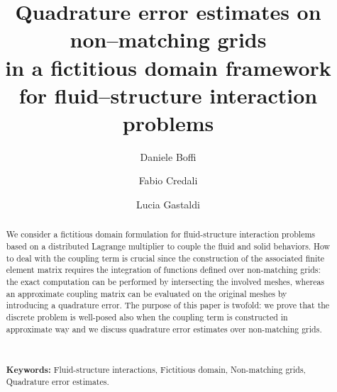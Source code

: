\documentclass[oneside]{amsart} %
\begin{document}
	
	\title[]{Quadrature error estimates on non--matching grids\\in a fictitious domain framework\\for fluid--structure interaction problems}%
	
	\author[Daniele Boffi]{Daniele Boffi}
	\address{Computer, electrical and mathematical sciences and engineering division, King Abdullah University of Science and Technology, Thuwal 23955, Saudi Arabia and Dipartimento di Matematica \textquoteleft F. Casorati\textquoteright, Universit\`a degli Studi di Pavia, via Ferrata 5, 27100, Pavia, Italy}
	
	\author{Fabio Credali}
	\address{Computer, electrical and mathematical sciences and engineering division, King Abdullah University of Science and Technology, Thuwal 23955, Saudi Arabia. Former affiliation: Istituto di Matematica Applicata e Tecnologie Informatiche \textquoteleft E. Magenes\textquoteright, Consiglio Nazionale delle Ricerche, via Ferrata 5, 27100, Pavia, Italy }
	
	\author{Lucia Gastaldi}
	\address{Dipartimento di Ingegneria Civile, Architettura, Territorio, Ambiente e di Matematica, Universit\`a degli Studi di Brescia, via Branze 43, 25123, Brescia, Italy}
	
	
	\begin{abstract}
		We consider a fictitious domain formulation for
fluid-structure interaction problems based on a distributed Lagrange
multiplier to couple the fluid and solid behaviors. How to deal with the
coupling term is crucial since the construction of the associated finite
element matrix requires the integration of functions defined over non-matching
grids: the exact computation can be performed by intersecting the involved
meshes, whereas an approximate coupling matrix can be evaluated on the
original meshes by introducing a quadrature error. The purpose of this paper is twofold: we prove that the discrete problem is well-posed also when the coupling term is constructed in approximate way and we discuss quadrature error estimates over non-matching grids.
		
		\
		
		\noindent\textbf{Keywords:} Fluid-structure interactions, Fictitious domain, Non-matching grids, Quadrature error estimates.
	\end{abstract}
	
\end{document}
